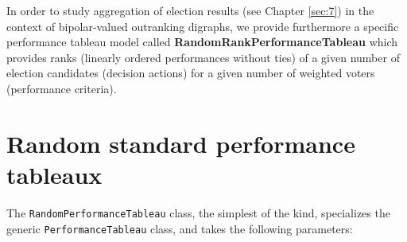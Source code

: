 In order to study aggregation of election results (see Chapter \ref{sec:7}) in the context of bipolar-valued outranking digraphs, we provide furthermore a specific performance tableau model called \textbf{RandomRankPerformanceTableau} which provides ranks (linearly ordered performances without ties) of a given number of election candidates (decision actions) for a given number of weighted voters (performance criteria).
 
\section{Random standard performance tableaux}
\label{sec:5.2}
    
The {\tt RandomPerformanceTableau} class, the simplest of the kind, specializes the generic {\tt PerformanceTableau} class, and takes the following parameters:
